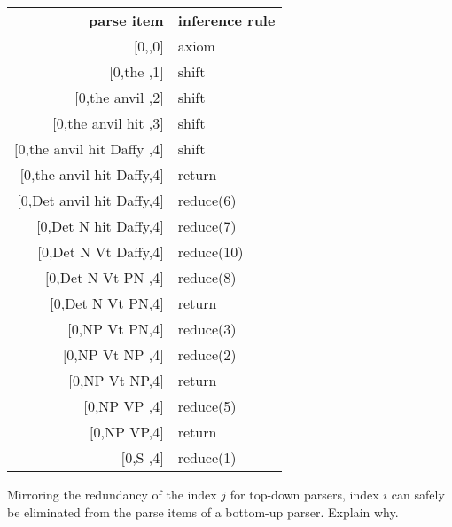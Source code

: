 \begin{examplebox}
    \phantom{a}
    \begin{center}
        \begin{tabular}{r|l}
            \textbf{parse item}                     & \textbf{inference rule}\\
            $\lbrack$0,\psep,0]                     & axiom\\
            $\lbrack$0,the \psep,1]                 & shift\\
            $\lbrack$0,the anvil \psep,2]           & shift\\
            $\lbrack$0,the anvil hit \psep,3]       & shift\\
            $\lbrack$0,the anvil hit Daffy \psep,4] & shift\\
            $\lbrack$0,\psep the anvil hit Daffy,4] & return\\
            $\lbrack$0,Det \psep anvil hit Daffy,4] & reduce(6)\\
            $\lbrack$0,Det N \psep hit Daffy,4]     & reduce(7)\\
            $\lbrack$0,Det N Vt \psep Daffy,4]      & reduce(10)\\
            $\lbrack$0,Det N Vt PN \psep,4]         & reduce(8)\\
            $\lbrack$0,\psep Det N Vt PN,4]         & return\\
            $\lbrack$0,NP \psep Vt PN,4]            & reduce(3)\\
            $\lbrack$0,NP Vt NP \psep,4]            & reduce(2)\\
            $\lbrack$0,\psep NP Vt NP,4]            & return\\
            $\lbrack$0,NP VP \psep,4]               & reduce(5)\\
            $\lbrack$0,\psep NP VP,4]               & return\\
            $\lbrack$0,S \psep,4]                   & reduce(1)\\
        \end{tabular}
    \end{center}
\end{examplebox}
%
\begin{exercise}
    Mirroring the redundancy of the index $j$ for top-down parsers, index $i$ can safely be eliminated from the parse items of a bottom-up parser.    
    Explain why.
\end{exercise}

